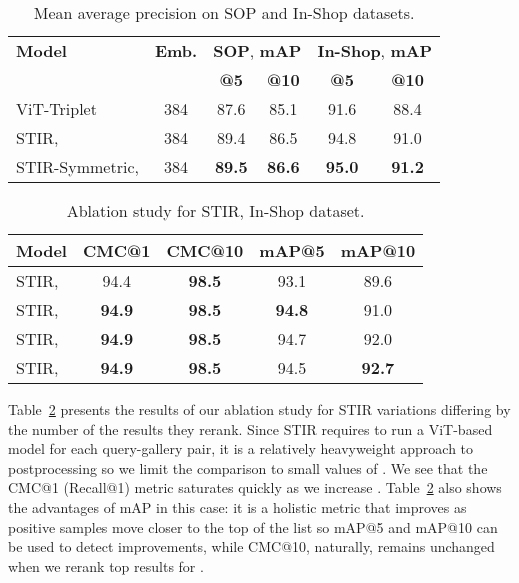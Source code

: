 \documentclass{article}
\begin{document}
\begin{table}[t]\centering
\caption{Mean average precision on SOP and In-Shop datasets.}\label{tbl:map}
\setlength{\tabcolsep}{4pt}
\begin{tabular}{lc|cc|cc}
\toprule
\textbf{Model} & \textbf{Emb.} & \multicolumn{2}{c|}{\textbf{SOP}, \textbf{mAP}} & \multicolumn{2}{c}{\textbf{In-Shop}, \textbf{mAP}} \\
& & \textbf{@5} & \textbf{@10} & \textbf{@5} & \textbf{@10} \\\midrule
ViT-Triplet & 384 & 87.6 & 85.1 & 91.6 & 88.4 \\
STIR,  & 384 & 89.4 & 86.5 & 94.8 & 91.0 \\
STIR-Symmetric,  & 384 & \textbf{89.5} & \textbf{86.6} & \textbf{95.0} & \textbf{91.2} \\
\bottomrule
\end{tabular}
\end{table}

\begin{table}[t]\centering
\caption{Ablation study for STIR, In-Shop dataset.}\label{tbl:stir}
\setlength{\tabcolsep}{4pt}
\begin{tabular}{l|cc|cc}
\toprule
\textbf{Model} & \textbf{CMC@1} & \textbf{CMC@10} & \textbf{mAP@5} & \textbf{mAP@10} \\\midrule
STIR,  & 94.4 & \textbf{98.5} & 93.1 & 89.6 \\
STIR,  & \textbf{94.9} & \textbf{98.5} & \textbf{94.8} & 91.0 \\
STIR,  & \textbf{94.9} & \textbf{98.5} & 94.7 & 92.0 \\
STIR,  & \textbf{94.9} & \textbf{98.5} & 94.5 & \textbf{92.7} \\
\bottomrule
\end{tabular}
\end{table}
 
Table~\ref{tbl:stir} presents the results of our ablation study for STIR variations differing by the number  of the results they rerank. Since STIR requires to run a ViT-based model for each query-gallery pair, it is a relatively heavyweight approach to postprocessing so we limit the comparison to small values of . We see that the CMC@1 (Recall@1) metric saturates quickly as we increase . Table~\ref{tbl:stir} also shows the advantages of mAP in this case: it is a holistic metric that improves as positive samples move closer to the top of the list so mAP@5 and mAP@10 can be used to detect improvements, while CMC@10, naturally, remains unchanged when we rerank top results for .
\end{document}
